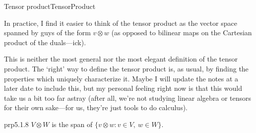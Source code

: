 \begin{dfn}{Tensor product}{TensorProduct}
\begin{rmk}
\end{rmk}
\begin{rmk}
In practice, I find it easier to think of the tensor product as the vector space spanned by guys of the form $v\otimes w$ (as opposed to bilinear maps on the Cartesian product of the duals---ick).
\end{rmk}
\begin{rmk}
This is neither the most general nor the most elegant definition of the tensor product.  The `right' way to define the tensor product is, as usual, by finding the properties which uniquely characterize it.  Maybe I will update the notes at a later date to include this, but my personal feeling right now is that this would take us a bit too far astray (after all, we're not studying linear algebra or tensors for their own sake---for us, they're just tools to do calculus).
\end{rmk}
\end{dfn}
\begin{prp}{}{prp5.1.8}
$V\otimes W$ is the span of $\{ v\otimes w:v\in V,\ w\in W\}$.
\end{prp}
